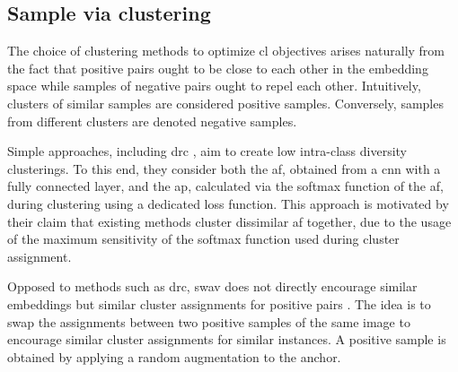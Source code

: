 \subsection{Sample via clustering}
\label{subsec:SampleViaClustering}

The choice of clustering methods to optimize \ac{cl} objectives 
arises naturally from the fact that positive pairs ought to be close 
to each other in the embedding space 
while samples of negative pairs ought to repel each other.
Intuitively, clusters of similar samples are considered positive samples.
Conversely, samples from different clusters are denoted negative samples.

Simple approaches, including \ac{drc} \citet{DRC_2020}, aim to create low intra-class diversity clusterings. 
To this end, they consider both the \ac{af}, obtained from a \ac{cnn} with a fully connected layer, 
and the \ac{ap}, calculated via the softmax function of the \ac{af}, 
during clustering using a dedicated loss function.
This approach is motivated by their claim that existing methods cluster dissimilar \ac{af} together,
due to the usage of the maximum sensitivity of the softmax function used during cluster assignment.

Opposed to methods such as \ac{drc}, \ac{swav} does not directly encourage similar embeddings 
but similar 
cluster assignments for positive pairs \citet{swav_2020}.
The idea is to swap the assignments between two positive samples of the same image to encourage 
similar cluster assignments for similar instances.
A positive sample is obtained by applying a random augmentation to the anchor.





